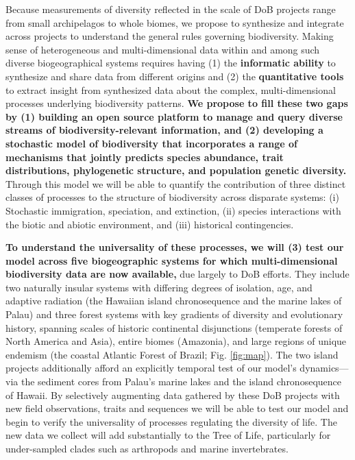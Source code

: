 \documentclass[11pt]{article}
\begin{document}
Because measurements of diversity reflected in the scale of DoB
projects range from small archipelagos to whole biomes, we propose to
synthesize and integrate across projects to understand the general
rules governing biodiversity. Making sense of heterogeneous and
multi-dimensional data within and among such diverse biogeographical
systems requires having (1) the \textbf{informatic ability} to
synthesize and share data from different origins and (2) the
\textbf{quantitative tools} to extract insight from synthesized data
about the complex, multi-dimensional processes underlying biodiversity
patterns. \textbf{We propose to fill these two gaps by (1) building an
  open source platform to manage and query diverse streams of
  biodiversity-relevant information, and (2) developing a stochastic
  model of biodiversity that incorporates a range of mechanisms that
  jointly predicts species abundance, trait distributions,
  phylogenetic structure, and population genetic diversity.}  Through
this model we will be able to quantify the contribution of three
distinct classes of processes to the structure of biodiversity across
disparate systems: (i) Stochastic immigration, speciation, and
extinction, (ii) species interactions with the biotic and abiotic
environment, and (iii) historical contingencies.

\textbf{To understand the universality of these processes, we will (3)
  test our model across five biogeographic systems for which
  multi-dimensional biodiversity data are now available,} due largely
to DoB efforts. They include two naturally insular systems with
differing degrees of isolation, age, and adaptive radiation (the
Hawaiian island chronosequence and the marine lakes of Palau) and
three forest systems with key gradients of diversity and evolutionary
history, spanning scales of historic continental disjunctions
(temperate forests of North America and Asia), entire biomes
(Amazonia), and large regions of unique endemism (the coastal Atlantic
Forest of Brazil; Fig. \ref{fig:map}). The two island projects
additionally afford an explicitly temporal test of our model's
dynamics---via the sediment cores from Palau's marine lakes and the
island chronosequence of Hawaii. By selectively augmenting data
gathered by these DoB projects with new field observations, traits and
sequences we will be able to test our model and begin to verify the
universality of processes regulating the diversity of life. The new
data we collect will add substantially to the Tree of Life,
particularly for under-sampled clades such as arthropods and marine
invertebrates.
\end{document}
